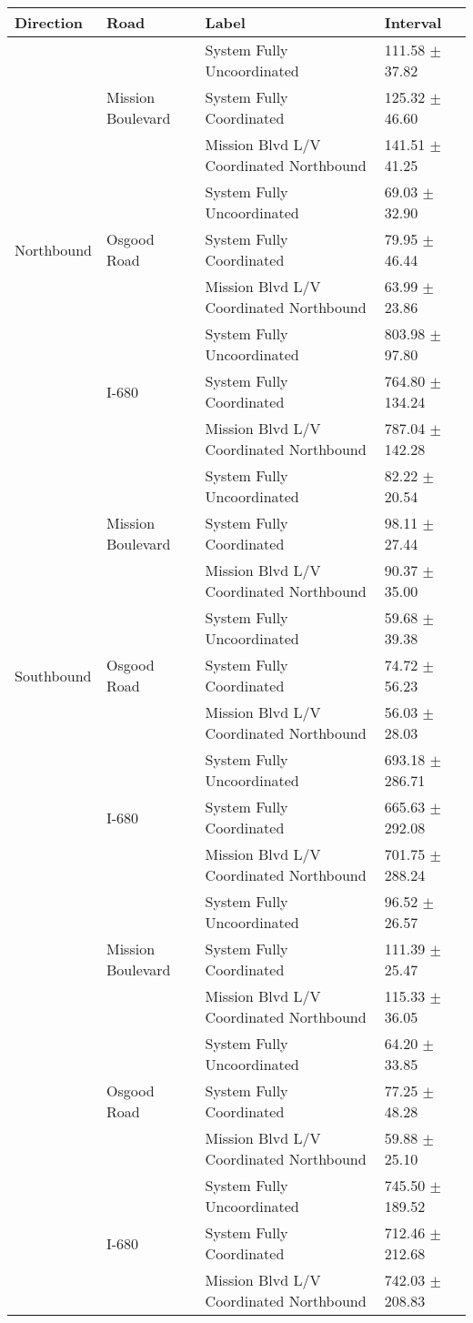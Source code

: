 \begin{tabular}{llll}
\toprule
Direction & Road & Label & Interval \\
\midrule
\multirow[t]{9}{*}{Northbound} & \multirow[t]{3}{*}{Mission Boulevard} & System Fully Uncoordinated & 111.58 $\pm$ 37.82 \\
 &  & System Fully Coordinated & 125.32 $\pm$ 46.60 \\
 &  & Mission Blvd L/V Coordinated Northbound & 141.51 $\pm$ 41.25 \\
 & \multirow[t]{3}{*}{Osgood Road} & System Fully Uncoordinated & 69.03 $\pm$ 32.90 \\
 &  & System Fully Coordinated & 79.95 $\pm$ 46.44 \\
 &  & Mission Blvd L/V Coordinated Northbound & 63.99 $\pm$ 23.86 \\
 & \multirow[t]{3}{*}{I-680} & System Fully Uncoordinated & 803.98 $\pm$ 97.80 \\
 &  & System Fully Coordinated & 764.80 $\pm$ 134.24 \\
 &  & Mission Blvd L/V Coordinated Northbound & 787.04 $\pm$ 142.28 \\
\multirow[t]{9}{*}{Southbound} & \multirow[t]{3}{*}{Mission Boulevard} & System Fully Uncoordinated & 82.22 $\pm$ 20.54 \\
 &  & System Fully Coordinated & 98.11 $\pm$ 27.44 \\
 &  & Mission Blvd L/V Coordinated Northbound & 90.37 $\pm$ 35.00 \\
 & \multirow[t]{3}{*}{Osgood Road} & System Fully Uncoordinated & 59.68 $\pm$ 39.38 \\
 &  & System Fully Coordinated & 74.72 $\pm$ 56.23 \\
 &  & Mission Blvd L/V Coordinated Northbound & 56.03 $\pm$ 28.03 \\
 & \multirow[t]{3}{*}{I-680} & System Fully Uncoordinated & 693.18 $\pm$ 286.71 \\
 &  & System Fully Coordinated & 665.63 $\pm$ 292.08 \\
 &  & Mission Blvd L/V Coordinated Northbound & 701.75 $\pm$ 288.24 \\
\multirow[t]{9}{*}{} & \multirow[t]{3}{*}{Mission Boulevard} & System Fully Uncoordinated & 96.52 $\pm$ 26.57 \\
 &  & System Fully Coordinated & 111.39 $\pm$ 25.47 \\
 &  & Mission Blvd L/V Coordinated Northbound & 115.33 $\pm$ 36.05 \\
 & \multirow[t]{3}{*}{Osgood Road} & System Fully Uncoordinated & 64.20 $\pm$ 33.85 \\
 &  & System Fully Coordinated & 77.25 $\pm$ 48.28 \\
 &  & Mission Blvd L/V Coordinated Northbound & 59.88 $\pm$ 25.10 \\
 & \multirow[t]{3}{*}{I-680} & System Fully Uncoordinated & 745.50 $\pm$ 189.52 \\
 &  & System Fully Coordinated & 712.46 $\pm$ 212.68 \\
 &  & Mission Blvd L/V Coordinated Northbound & 742.03 $\pm$ 208.83 \\
\bottomrule
\end{tabular}
